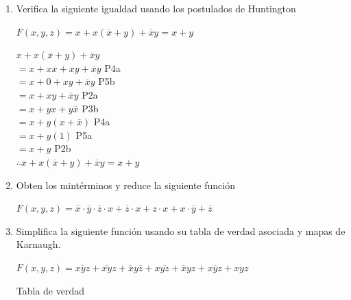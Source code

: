\documentclass[a4paper,12pt]{article}
\begin{document}
\begin{enumerate}[label=\textcolor{teal}{\textbf{\arabic*.}}]
        

    \item Verifica la siguiente igualdad usando los postulados de Huntington
            \begin{center}
                $F(x,y,z) = x + x(\overline{x} + y) + \overline{x} y = x + y$
            \end{center}

            $x + x(\overline{x} + y) + \overline{x} y$\\
            $= x + x\overline{x} + xy + \overline{x} y$ P4a\\
            $= x + 0 + xy + \overline{x} y$ P5b\\
            $= x + xy + \overline{x} y$ P2a\\
            $= x + yx + y\overline{x} $ P3b\\
            $= x + y(x + \overline{x}) $ P4a\\
            $= x + y(1) $ P5a\\
            $= x + y $ P2b\\

            $ \therefore x + x(\overline{x} + y) + \overline{x} y = x + y$\\
           

    \item Obten los mintérminos y reduce la siguiente función 
        \begin{center}
            $F(x,y,z) = \overline{x} \cdot \overline{y} \cdot \overline{z} \cdot x + \overline{z} \cdot x + z \cdot x + x \cdot \overline{y} + \overline{z} $
        \end{center}

    \item Simplifica la siguiente función usando su tabla de verdad asociada y mapas de Karnaugh.
    
        \begin{center}
            $F(x,y,z) = \overline{xyz} + \overline{xy} z + \overline{x} y \overline{z} + x \overline{yz} +  \overline{x} yz +x \overline{y} z +xyz $
        \end{center}

        Tabla de verdad


\end{enumerate}
\end{document}
